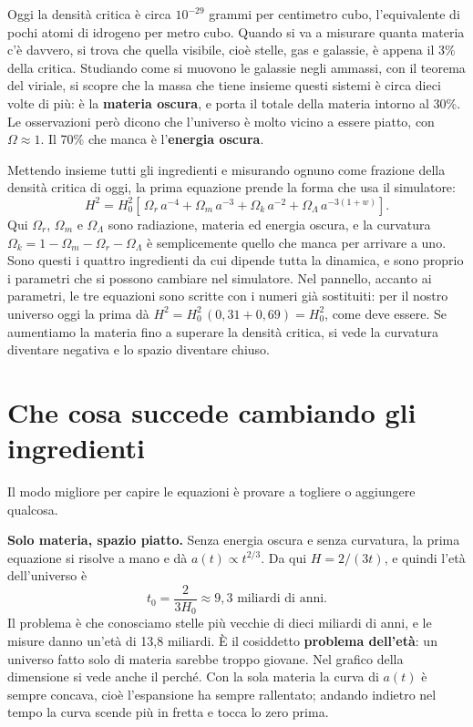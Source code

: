 \documentclass[12pt,a4paper]{article}
\begin{document}
Oggi la densità critica è circa $10^{-29}$ grammi per centimetro cubo, l'equivalente di pochi atomi di idrogeno per metro cubo. Quando si va a misurare quanta materia c'è davvero, si trova che quella visibile, cioè stelle, gas e galassie, è appena il 3\% della critica. Studiando come si muovono le galassie negli ammassi, con il teorema del viriale, si scopre che la massa che tiene insieme questi sistemi è circa dieci volte di più: è la \textbf{materia oscura}, e porta il totale della materia intorno al 30\%. Le osservazioni però dicono che l'universo è molto vicino a essere piatto, con $\Omega \approx 1$. Il 70\% che manca è l'\textbf{energia oscura}.

Mettendo insieme tutti gli ingredienti e misurando ognuno come frazione della densità critica di oggi, la prima equazione prende la forma che usa il simulatore:
\[ H^2 = H_0^2 \left[\,\Omega_r\, a^{-4} + \Omega_m\, a^{-3} + \Omega_k\, a^{-2} + \Omega_\Lambda\, a^{-3(1+w)}\right]. \]
Qui $\Omega_r$, $\Omega_m$ e $\Omega_\Lambda$ sono radiazione, materia ed energia oscura, e la curvatura $\Omega_k = 1 - \Omega_m - \Omega_r - \Omega_\Lambda$ è semplicemente quello che manca per arrivare a uno. Sono questi i quattro ingredienti da cui dipende tutta la dinamica, e sono proprio i parametri che si possono cambiare nel simulatore. Nel pannello, accanto ai parametri, le tre equazioni sono scritte con i numeri già sostituiti: per il nostro universo oggi la prima dà $H^2 = H_0^2\,(0{,}31 + 0{,}69) = H_0^2$, come deve essere. Se aumentiamo la materia fino a superare la densità critica, si vede la curvatura diventare negativa e lo spazio diventare chiuso.

\section{Che cosa succede cambiando gli ingredienti}
Il modo migliore per capire le equazioni è provare a togliere o aggiungere qualcosa.

\textbf{Solo materia, spazio piatto.} Senza energia oscura e senza curvatura, la prima equazione si risolve a mano e dà $a(t) \propto t^{2/3}$. Da qui $H = 2/(3t)$, e quindi l'età dell'universo è
\[ t_0 = \frac{2}{3H_0} \approx 9{,}3 \text{ miliardi di anni}. \]
Il problema è che conosciamo stelle più vecchie di dieci miliardi di anni, e le misure danno un'età di 13,8 miliardi. È il cosiddetto \textbf{problema dell'età}: un universo fatto solo di materia sarebbe troppo giovane. Nel grafico della dimensione si vede anche il perché. Con la sola materia la curva di $a(t)$ è sempre concava, cioè l'espansione ha sempre rallentato; andando indietro nel tempo la curva scende più in fretta e tocca lo zero prima.
\end{document}
